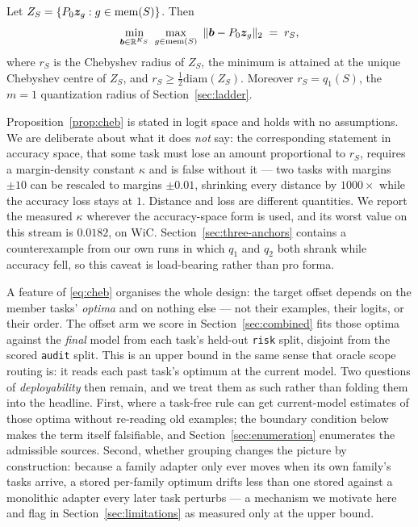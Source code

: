 \begin{proposition}
\label{prop:cheb}
Let $Z_S=\{P_0\bm{z}_g : g\in\mathrm{mem}(S)\}$. Then
\begin{equation}
  \min_{\bb\in\R^{K_S}}\ \max_{g\in\mathrm{mem}(S)}\ \|\bb-P_0\bz_g\|_2
  \;=\; r_S,
  \label{eq:cheb}
\end{equation}
where $r_S$ is the Chebyshev radius of $Z_S$, the minimum is attained at the
unique Chebyshev centre of $Z_S$, and $r_S\ge\tfrac{1}{2}\mathrm{diam}(Z_S)$.
Moreover $r_S=q_1(S)$, the $m=1$ quantization radius of Section~\ref{sec:ladder}.
\end{proposition}

Proposition~\ref{prop:cheb} is stated in logit space and holds with no
assumptions. We are deliberate about what it does \emph{not} say: the
corresponding statement in accuracy space, that some task must lose an amount
proportional to $r_S$, requires a margin-density constant $\kappa$ and is false
without it --- two tasks with margins $\pm10$ can be rescaled to margins
$\pm 0.01$, shrinking every distance by $1000\times$ while the accuracy loss stays
at $1$. Distance and loss are different quantities. We report the measured
$\kappa$ wherever the accuracy-space form is used, and its worst value on this
stream is $0.0182$, on WiC. Section~\ref{sec:three-anchors} contains a
counterexample from our own runs in which $q_1$ and $q_2$ both shrank while
accuracy fell, so this caveat is load-bearing rather than pro forma.

A feature of \eqref{eq:cheb} organises the whole design: the target offset depends
on the member tasks' \emph{optima} and on nothing else --- not their examples,
their logits, or their order. The offset arm we score in
Section~\ref{sec:combined} fits those optima against the \emph{final} model from
each task's held-out \texttt{risk} split, disjoint from the scored \texttt{audit}
split. This is an upper bound in the same sense that oracle scope routing is: it
reads each past task's optimum at the current model. Two questions of
\emph{deployability} then remain, and we treat them as such rather than folding
them into the headline. First, where a task-free rule can get current-model
estimates of those optima without re-reading old examples; the boundary condition
below makes the term itself falsifiable, and Section~\ref{sec:enumeration}
enumerates the admissible sources. Second, whether grouping changes the picture
by construction: because a family adapter only ever moves when its own family's
tasks arrive, a stored per-family optimum drifts less than one stored against a
monolithic adapter every later task perturbs --- a mechanism we motivate here and
flag in Section~\ref{sec:limitations} as measured only at the upper bound.

